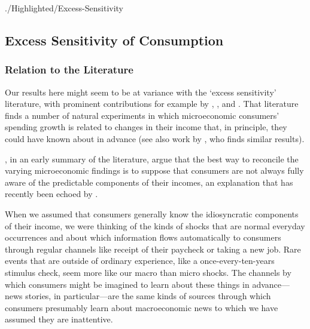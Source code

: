 \hypertarget{Excess-Sensitivity}{} %
\begin{verbatimwrite}{./Highlighted/Excess-Sensitivity}

  \subsection{Excess Sensitivity of Consumption} \label{sec:ExcessSens}

  \subsubsection{Relation to the Literature}

  Our results here might seem to be at variance with the `excess sensitivity' literature, with prominent contributions for example by \cite{soulelesTaxRefunds}, \cite{jpsTax}, and \cite{psjmMPC2008}.  That literature finds a number of natural experiments in which microeconomic consumers' spending growth is related to changes in their income that, in principle, they could have known about in advance (see also work by \cite{kuengTaxnews}, who finds similar results).

  \cite{BrowningColladoAER}, in an early summary of the literature, argue that the best way to reconcile the varying microeconomic findings is to suppose that consumers are not always fully aware of the predictable components of their incomes, an explanation that has recently been echoed by \cite{parker25million}.

  When we assumed that consumers generally know the idiosyncratic components of their income, we were thinking of the kinds of shocks that are normal everyday occurrences and about which information flows automatically to consumers through regular channels like receipt of their paycheck or taking a new job.  Rare events that are outside of ordinary experience, like a once-every-ten-years stimulus check, seem more like our macro than micro shocks.  The channels by which consumers might be imagined to learn about these things in advance---news stories, in particular---are the same kinds of sources through which consumers presumably learn about macroeconomic news to which we have assumed they are inattentive. %


\end{verbatimwrite}
